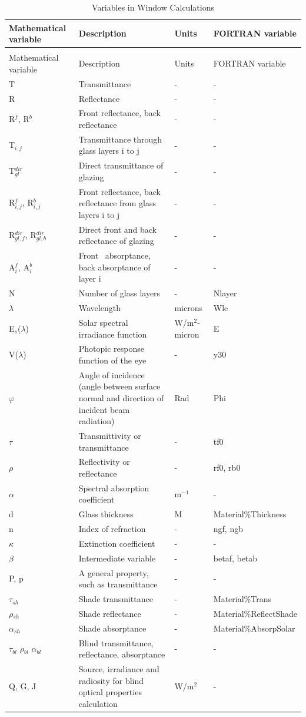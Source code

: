 \begin{longtable}[c]{p{1.0in}p{2.5in}p{1.0in}p{1.5in}}
\caption{Variables in Window Calculations \label{table:variables-in-window-calculations}} \tabularnewline
\toprule 
Mathematical variable & Description & Units & FORTRAN variable \tabularnewline
\midrule
\endfirsthead

\caption[]{Variables in Window Calculations} \tabularnewline
\toprule 
Mathematical variable & Description & Units & FORTRAN variable \tabularnewline
\midrule
\endhead

T & Transmittance & - & - \tabularnewline
R & Reflectance & - & - \tabularnewline
R\(^{f}\), R\(^{b}\) & Front reflectance, back reflectance & - & - \tabularnewline
T\(_{i,j}\) & Transmittance through glass layers i to j & - & - \tabularnewline
T\(^{dir}_{gl}\) & Direct transmittance of glazing & - & - \tabularnewline
R\(^{f}_{i,j}\), R\(^{b}_{i,j}\) & Front reflectance, back reflectance from glass layers i to j & - & - \tabularnewline
R\(^{dir}_{gl,f}\), R\(^{dir}_{gl,b}\) & Direct front and back reflectance of glazing & - & - \tabularnewline
A\(^{f}_{i}\), A\(^{b}_{i}\) & Front~ absorptance, back absorptance of layer i & - & - \tabularnewline
N & Number of glass layers & - & Nlayer \tabularnewline
$\lambda$ & Wavelength & microns & Wle \tabularnewline
E\(_{s}\)($\lambda$) & Solar spectral irradiance function & W/m\(^{2}\)-micron & E \tabularnewline
V($\lambda$) & Photopic response function of the eye & - & y30 \tabularnewline
$\varphi$ & Angle of incidence (angle between surface normal and direction of incident beam radiation) & Rad & Phi \tabularnewline
$\tau$ & Transmittivity or transmittance & - & tf0 \tabularnewline
$\rho$ & Reflectivity or reflectance & - & rf0, rb0 \tabularnewline
$\alpha$ & Spectral absorption coefficient & m\(^{-1}\) & - \tabularnewline
d & Glass thickness & M & Material\%Thickness \tabularnewline
n & Index of refraction & - & ngf, ngb \tabularnewline
$\kappa$ & Extinction coefficient & - & - \tabularnewline
$\beta$ & Intermediate variable & - & betaf, betab \tabularnewline
P, p & A general property, such as transmittance & - & - \tabularnewline
$\tau$\(_{sh}\) & Shade transmittance & - & Material\%Trans \tabularnewline
$\rho$\(_{sh}\) & Shade reflectance & - & Material\%ReflectShade \tabularnewline
$\alpha$\(_{sh}\) & Shade absorptance & - & Material\%AbsorpSolar \tabularnewline
$\tau$\(_{bl}\) $\rho$\(_{bl}\) $\alpha$\(_{bl}\) & Blind transmittance, reflectance, absorptance & - & - \tabularnewline
Q, G, J & Source, irradiance and radiosity for blind optical properties calculation & W/m\(^{2}\) & - \tabularnewline

\end{longtable}
